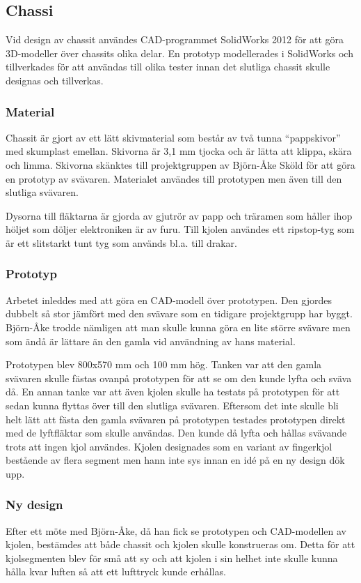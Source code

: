 \subsection{Chassi}
Vid design av chassit användes CAD-programmet SolidWorks 2012 för att göra
3D-modeller över chassits olika delar. En prototyp modellerades i SolidWorks och
tillverkades för att användas till olika tester innan det slutliga chassit
skulle designas och tillverkas.

\subsubsection{Material}
Chassit är gjort av ett lätt skivmaterial som består av två tunna “pappskivor”
med skumplast emellan. Skivorna är 3,1 mm tjocka och är lätta att klippa, skära
och limma. Skivorna skänktes till projektgruppen av Björn-Åke
Sköld för att göra en prototyp av svävaren. Materialet användes till prototypen
men även till den slutliga svävaren.

Dysorna till fläktarna är gjorda av gjutrör av papp  och träramen som håller
ihop höljet som döljer elektroniken är av furu. Till kjolen användes ett
ripstop-tyg som är ett slitstarkt tunt tyg som används bl.a. till drakar.

\subsubsection{Prototyp}
Arbetet inleddes med att göra en CAD-modell över prototypen. Den gjordes dubbelt
så stor jämfört med den svävare som en tidigare projektgrupp har byggt.
Björn-Åke trodde nämligen att man skulle kunna göra en lite större svävare men
som ändå är lättare än den gamla vid användning av hans material.

Prototypen blev 800x570 mm och 100 mm hög. Tanken var att den gamla svävaren
skulle fästas ovanpå prototypen för att se om den kunde lyfta och sväva då. En annan tanke var
att även kjolen skulle ha testats på prototypen för att sedan kunna flyttas över
till den slutliga svävaren. Eftersom det inte skulle bli helt lätt att fästa den
gamla svävaren på prototypen testades prototypen direkt med de lyftfläktar som
skulle användas. Den kunde då lyfta och hållas svävande trots att ingen kjol
användes. Kjolen designades som en variant av fingerkjol bestående av flera
segment men hann inte sys innan en idé på en ny design dök upp.

\subsubsection{Ny design}
Efter ett möte med Björn-Åke, då han fick se prototypen och CAD-modellen av
kjolen, bestämdes att både chassit och kjolen skulle konstrueras om. Detta för
att kjolsegmenten blev för små att sy och att kjolen i sin helhet inte skulle
kunna hålla kvar luften så att ett lufttryck kunde erhållas.

